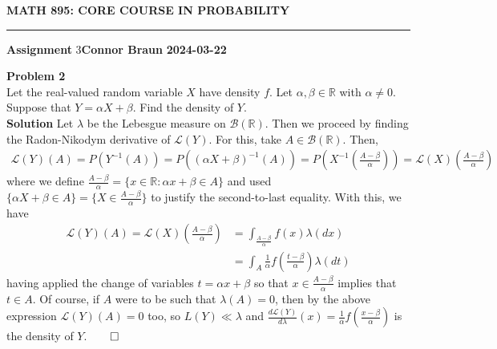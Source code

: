\documentclass[10pt]{article}
\newcommand{\bp}[1]{\left({#1}\right)}
\newcommand{\mbb}[1]{\mathbb{#1}}
\newcommand{\1}[1]{\mathbbm{1}_{#1}}
\newcommand{\mc}[1]{\mathcal{#1}}
\begin{document}
    \begin{center}
        {\bf\large{MATH 895: CORE COURSE IN PROBABILITY}}
        \smallskip
        \hrule
        \smallskip
        {\bf Assignment} 3\hfill {\bf Connor Braun} \hfill {\bf 2024-03-22}
    \end{center}
    {\bf Problem 2}\\[5pt]
    Let the real-valued random variable $X$ have density $f$. Let $\alpha,\beta\in\mbb{R}$ with $\alpha\neq 0$. Suppose that $Y=\alpha X+\beta$. Find the density of $Y$.\\[5pt]
    {\bf Solution}\hspace{5pt} Let $\lambda$ be the Lebesgue measure on $\mc{B}(\mbb{R})$. Then we proceed by finding the Radon-Nikodym derivative of $\mc{L}(Y)$. For this, take $A\in\mc{B}(\mbb{R})$. Then,
    \begin{align*}
        \mc{L}(Y)(A)=P(Y^{-1}(A))=P((\alpha X+\beta)^{-1}(A))=P\bp{X^{-1}\bp{\frac{A-\beta}{\alpha}}}=\mc{L}(X)\bp{\frac{A-\beta}{\alpha}}
    \end{align*}
    where we define $\tfrac{A-\beta}{\alpha}=\{x\in\mbb{R}:\alpha x+\beta\in A\}$ and used $\{\alpha X+\beta\in A\}=\{X\in\tfrac{A-\beta}{\alpha}\}$ to justify the second-to-last equality. With this, we have
    \begin{align*}
        \mc{L}(Y)(A)=\mc{L}(X)\bp{\frac{A-\beta}{\alpha}}&=\int_{\frac{A-\beta}{\alpha}}f(x)\lambda(dx)\\
        &=\int_A\frac{1}{\alpha}f\bp{\frac{t-\beta}{\alpha}}\lambda(dt)
    \end{align*}
    having applied the change of variables $t=\alpha x+\beta$ so that $x\in\tfrac{A-\beta}{\alpha}$ implies that $t\in A$. Of course, if $A$ were to be such that $\lambda(A)=0$, then by the above expression $\mc{L}(Y)(A)=0$ too, so $L(Y)\ll\lambda$ and $\tfrac{d\mc{L}(Y)}{d\lambda}(x)=\frac{1}{\alpha}f\bp{\tfrac{x-\beta}{\alpha}}$ is
    the density of $Y$.\hfill{$\qed$}\\[5pt]
\end{document}

